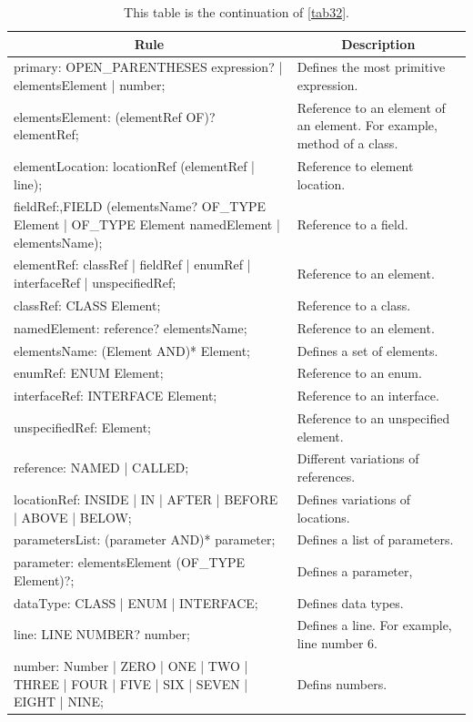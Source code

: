 \begin{table}[H]
	\centering
	\begin{tabular}{|p{8cm}|p{7cm}|}
		\hline
		\multicolumn{1}{|c|}{{\bf Rule}} & \multicolumn{1}{c|}{{\bf Description}} \\ \hline
		primary: OPEN\_PARENTHESES expression? | elementsElement | number; & Defines the most primitive expression. \\ \hline
		elementsElement: (elementRef OF)? elementRef; & Reference to an element of an element. For example, method of a class. \\ \hline
		elementLocation: locationRef (elementRef | line); & Reference to element location. \\ \hline
		fieldRef:,FIELD (elementsName? OF\_TYPE Element | OF\_TYPE Element namedElement | elementsName); & Reference to a field. \\ \hline
		elementRef: classRef | fieldRef | enumRef | interfaceRef | unspecifiedRef; & Reference to an element. \\ \hline
		classRef: CLASS Element; & Reference to a class. \\ \hline
		namedElement: reference? elementsName; & Reference to an element. \\ \hline
		elementsName: (Element AND)* Element; & Defines a set of elements. \\ \hline
		enumRef: ENUM Element; & Reference to an enum. \\ \hline
		interfaceRef: INTERFACE Element; & Reference to an interface. \\ \hline
		unspecifiedRef: Element; & Reference to an unspecified element. \\ \hline
		reference: NAMED | CALLED; & Different variations of references. \\ \hline
		locationRef: INSIDE | IN | AFTER | BEFORE | ABOVE | BELOW; & Defines variations of locations. \\ \hline
		parametersList: (parameter AND)* parameter; & Defines a list of parameters. \\ \hline
		parameter: elementsElement (OF\_TYPE Element)?; & Defines a parameter, \\ \hline
		dataType: CLASS | ENUM | INTERFACE; & Defines data types. \\ \hline
		line: LINE NUMBER? number; & Defines a line. For example, line number 6. \\ \hline
		number: Number | ZERO | ONE | TWO | THREE | FOUR | FIVE | SIX | SEVEN | EIGHT | NINE; & Defins numbers. \\ \hline
	\end{tabular}
	\caption{This table is the continuation of \autoref{tab32}.}
	\label{tab33}
\end{table}

